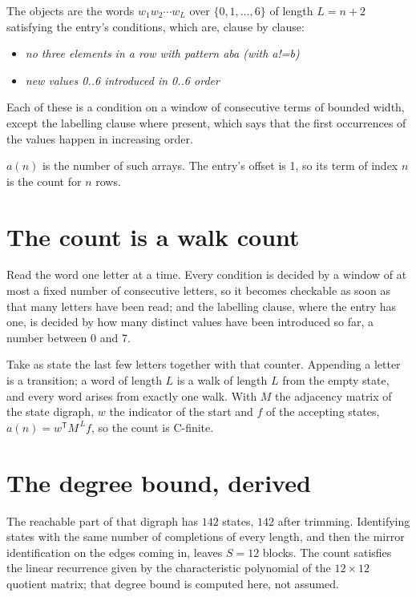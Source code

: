 \documentclass[11pt]{article}
\theoremstyle{definition}
\begin{document}
The objects are the words $w_1 w_2 \cdots w_L$ over $\{0,1,\dots,6\}$ of length $L = n + 2$ satisfying the entry's conditions, which are, clause by clause:

\begin{itemize}

\item {\itshape no three elements in a row with pattern aba (with a!=b)}

\item {\itshape new values 0..6 introduced in 0..6 order}

\end{itemize}

Each of these is a condition on a window of consecutive terms of bounded width, except the labelling clause where present, which says that the first occurrences of the values happen in increasing order.

$a(n)$ is the number of such arrays. The entry's offset is 1, so its term of index $n$ is the count for $n$ rows.

\section{The count is a walk count}

Read the word one letter at a time. Every condition is decided by a window of at most a fixed number of consecutive letters, so it becomes checkable as soon as that many letters have been read; and the labelling clause, where the entry has one, is decided by how many distinct values have been introduced so far, a number between $0$ and 7.

Take as state the last few letters together with that counter. Appending a letter is a transition; a word of length $L$ is a walk of length $L$ from the empty state, and every word arises from exactly one walk. With $M$ the adjacency matrix of the state digraph, $w$ the indicator of the start and $f$ of the accepting states, $a(n) = w^{\mathsf T}M^{\,L}f$, so the count is C-finite.

\section{The degree bound, derived}

The reachable part of that digraph has $142$ states, $142$ after trimming. Identifying states with the same number of completions of every length, and then the mirror identification on the edges coming in, leaves $S = 12$ blocks. The count satisfies the linear recurrence given by the characteristic polynomial of the $12\times12$ quotient matrix; that degree bound is computed here, not assumed.
\end{document}
